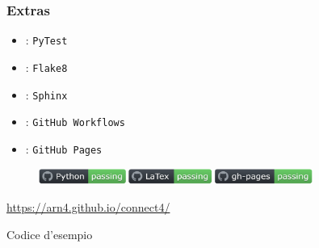 \documentclass{beamer}
\begin{document}
  \begin{frame}
    \frametitle{Extras}
    \begin{itemize}
      \item {}: \texttt{PyTest}
      \item {}: \texttt{Flake8}
      \item {}: \texttt{Sphinx}
      \item {}: \texttt{GitHub Workflows}
      \item {}: \texttt{GitHub Pages}  
    \end{itemize}
    \begin{figure}
      \includegraphics[width=0.8\textwidth]{img/github_badges.png}
    \end{figure}
    \begin{center}
      \url{https://arn4.github.io/connect4/}
    \end{center}
  \end{frame}


  \begin{frame}{Codice d'esempio}
  \inputminted[fontsize=\scriptsize]{python3}{code/example-game.py}
  \end{frame}
\end{document}
